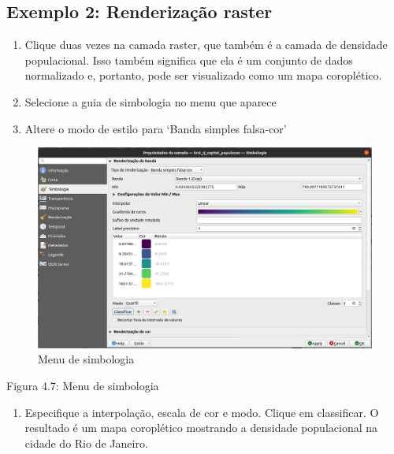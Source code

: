 \documentclass[
  portuguese,
]{krantz}
\providecommand{\tightlist}{%
  \setlength{\itemsep}{0pt}\setlength{\parskip}{0pt}}
\begin{document}
\hypertarget{exemplo-2-renderizauxe7uxe3o-raster}{%
\subsection{\texorpdfstring{\textbf{Exemplo 2: Renderização raster}}{Exemplo 2: Renderização raster}}\label{exemplo-2-renderizauxe7uxe3o-raster}}

\begin{enumerate}
\def\labelenumi{\arabic{enumi}.}
\tightlist
\item
  Clique duas vezes na camada raster, que também é a camada de densidade populacional. Isso também significa que ela é um conjunto de dados normalizado e, portanto, pode ser visualizado como um mapa coroplético.
\item
  Selecione a guia de simbologia no menu que aparece
\item
  Altere o modo de estilo para `Banda simples falsa-cor'
\end{enumerate}

\begin{figure}
\centering
\includegraphics{media/modulo4/qgis9.png}
\caption{Menu de simbologia}
\end{figure}

Figura 4.7: Menu de simbologia

\begin{enumerate}
\def\labelenumi{\arabic{enumi}.}
\setcounter{enumi}{3}
\tightlist
\item
  Especifique a interpolação, escala de cor e modo. Clique em classificar. O resultado é um mapa coroplético mostrando a densidade populacional na cidade do Rio de Janeiro.
\end{enumerate}
\end{document}
